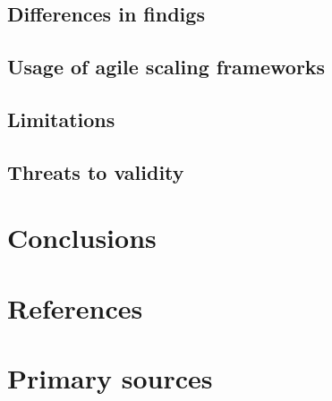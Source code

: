 \documentclass{article}
\begin{document}
\subsection{Differences in findigs}

\subsection{Usage of agile scaling frameworks}

\subsection{Limitations}

\subsection{Threats to validity}

\section{Conclusions}


\section{References}

\section{Primary sources}

\end{document}
